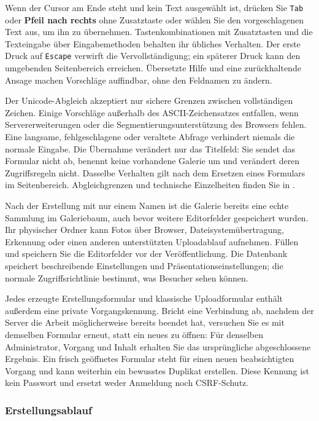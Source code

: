 \documentclass[11pt,a4paper]{article}
\newcommand{\filepath}[1]{\path{#1}}
\newcommand{\ui}[1]{\textbf{#1}}
\newcommand{\codeword}[1]{\nolinkurl{#1}}
\begin{document}
Wenn der Cursor am Ende steht und kein Text ausgewählt ist, drücken Sie
\codeword{Tab} oder \ui{Pfeil nach rechts} ohne Zusatztaste oder wählen Sie den
vorgeschlagenen Text aus, um ihn zu übernehmen. Tastenkombinationen mit
Zusatztasten und die Texteingabe über Eingabemethoden behalten ihr übliches
Verhalten. Der erste Druck auf \codeword{Escape} verwirft die Vervollständigung;
ein späterer Druck kann den umgebenden Seitenbereich erreichen. Übersetzte Hilfe
und eine zurückhaltende Ansage machen Vorschläge auffindbar, ohne den Feldnamen
zu ändern.

Der Unicode-Abgleich akzeptiert nur sichere Grenzen zwischen vollständigen
Zeichen. Einige Vorschläge außerhalb des ASCII-Zeichensatzes entfallen, wenn
Servererweiterungen oder die Segmentierungsunterstützung des Browsers fehlen.
Eine langsame, fehlgeschlagene oder veraltete Abfrage verhindert niemals die
normale Eingabe. Die Übernahme verändert nur das Titelfeld: Sie sendet das
Formular nicht ab, benennt keine vorhandene Galerie um und verändert deren
Zugriffsregeln nicht. Dasselbe Verhalten gilt nach dem Ersetzen eines Formulars
im Seitenbereich. Abgleichgrenzen und technische Einzelheiten finden Sie in
\filepath{docs/TITLE_COMPLETION.md}.

Nach der Erstellung mit nur einem Namen ist die Galerie bereits eine echte
Sammlung im Galeriebaum, auch bevor weitere Editorfelder gespeichert wurden. Ihr
physischer Ordner kann Fotos über Browser, Dateisystemübertragung, Erkennung
oder einen anderen unterstützten Uploadablauf aufnehmen. Füllen und speichern
Sie die Editorfelder vor der Veröffentlichung. Die Datenbank speichert
beschreibende Einstellungen und Präsentationseinstellungen; die normale
Zugriffsrichtlinie bestimmt, was Besucher sehen können.

Jedes erzeugte Erstellungsformular und klassische Uploadformular enthält
außerdem eine private Vorgangskennung. Bricht eine Verbindung ab, nachdem der
Server die Arbeit möglicherweise bereits beendet hat, versuchen Sie es mit
demselben Formular erneut, statt ein neues zu öffnen: Für denselben
Administrator, Vorgang und Inhalt erhalten Sie das ursprüngliche abgeschlossene
Ergebnis. Ein frisch geöffnetes Formular steht für einen neuen beabsichtigten
Vorgang und kann weiterhin ein bewusstes Duplikat erstellen. Diese Kennung ist
kein Passwort und ersetzt weder Anmeldung noch CSRF-Schutz.

\subsubsection{Erstellungsablauf}
\end{document}
